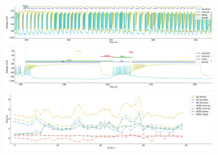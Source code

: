 \begin{figure}[htbp]
	\centering
	\begin{minipage}[b]{\textwidth}
		\centering
		\includegraphics[width=\textwidth,height=0.1\textheight]{./invariants/data/SUSSEX/CV1a_driven4/images/stim_cv1a4_signal_intervals_zoom.pdf}
		\includegraphics[width=\textwidth]{./invariants/data/SUSSEX/CV1a_driven4/images/stim_cv1a4_signal_intervals_cycle.pdf}
		\includegraphics[width=\textwidth]{./invariants/data/SUSSEX/CV1a_driven4/images/stim_cv1a4_time_cycle.pdf}
	\end{minipage}
	\centering
	\begin{minipage}[b]{0.43\textwidth}
		\centering

\end{minipage}
\end{figure}
